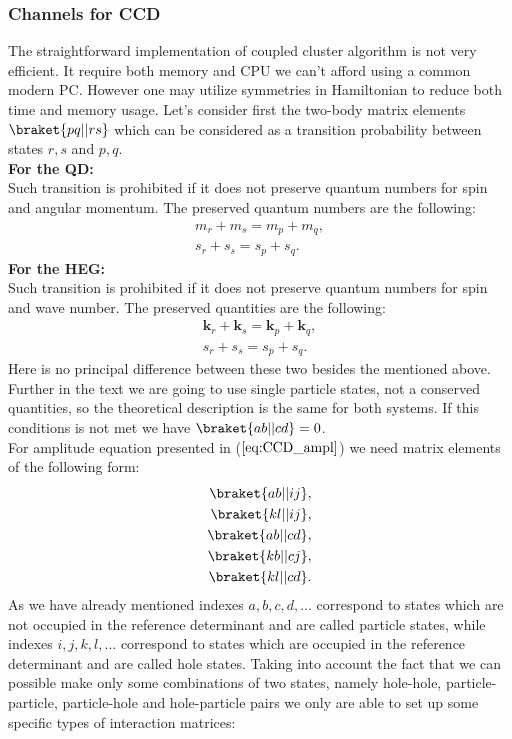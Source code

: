 \subsubsection{Channels for CCD}
The straightforward implementation of coupled cluster algorithm is not very efficient. It require both memory and CPU we can't afford using a common modern PC. However one may utilize symmetries in Hamiltonian to reduce both time and memory usage. Let's consider first the two-body matrix elements $\braket{pq||rs}$ which can be considered as a transition probability between states $r,s$ and $p,q$.\\
\textbf{For the QD:}\\
Such transition is prohibited if it does not preserve quantum numbers for spin and angular momentum. The preserved quantum numbers are the following:
\begin{align}
m_r + m_s = m_p + m_q,\\
s_r + s_s = s_p + s_q.
\end{align}
\textbf{For the HEG:}\\
Such transition is prohibited if it does not preserve quantum numbers for spin and wave number. The preserved quantities are the following:
\begin{align}
\textbf{k}_r + \textbf{k}_s = \textbf{k}_p + \textbf{k}_q,\\
s_r + s_s = s_p + s_q.
\end{align}
Here is no principal difference between these two besides the mentioned above. Further in the text we are going to use single particle states, not a conserved quantities, so the theoretical description is the same for both systems.
If this conditions is not met we have $\braket{ab||cd} = 0$.\\
For amplitude equation presented in ($\ref{eq:CCD_ampl}$) we need matrix elements of the following form:
\begin{align}\label{eq:TBME_channels}
\braket{ab||ij}&,\\
\braket{kl||ij}&,\\
\braket{ab||cd}&,\\
\braket{kb||cj}&,\\
\braket{kl||cd}&.\\
\end{align}
As we have already mentioned indexes $a,b,c,d,...$ correspond to states which are not occupied in the reference determinant and are called particle states, while  indexes $i,j,k,l,...$ correspond to states which are occupied in the reference determinant and are called hole states. Taking into account the fact that we can possible make only some combinations of two states, namely hole-hole, particle-particle, particle-hole and hole-particle pairs we only are able to set up some  specific types of interaction matrices:
